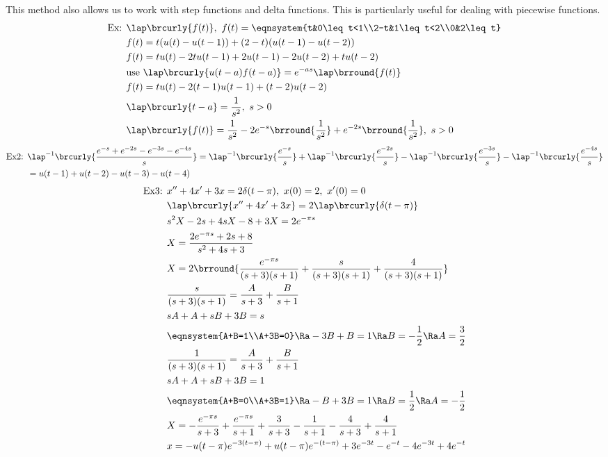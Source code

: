 This method also allows us to work with step functions and delta functions. This is particularly useful for dealing with piecewise functions.\\
\begin{align*}
    \text{Ex: }&\lap\brcurly{f(t)},\ f(t)=\eqnsystem{t&0\leq t<1\\2-t&1\leq t<2\\0&2\leq t}\\
    &f(t)=t(u(t)-u(t-1))+(2-t)(u(t-1)-u(t-2))\\
    &f(t)=tu(t)-2tu(t-1)+2u(t-1)-2u(t-2)+tu(t-2)\\
    &\text{use }\lap\brcurly{u(t-a)f(t-a)}=e^{-as}\lap\brround{f(t)}\\
    &f(t)=tu(t)-2(t-1)u(t-1)+(t-2)u(t-2)\\
    &\lap\brcurly{t-a}=\frac{1}{s^2},\ s>0\\
    &\lap\brcurly{f(t)}=\frac{1}{s^2}-2e^{-s}\brround{\frac{1}{s^2}}+e^{-2s}\brround{\frac{1}{s^2}},\ s>0
\end{align*}
\begin{align*}
    \text{Ex2: }&\lap^{-1}\brcurly{\frac{e^{-s}+e^{-2s}-e^{-3s}-e^{-4s}}{s}}=\lap^{-1}\brcurly{\frac{e^{-s}}{s}}+\lap^{-1}\brcurly{\frac{e^{-2s}}{s}}-\lap^{-1}\brcurly{\frac{e^{-3s}}{s}}-\lap^{-1}\brcurly{\frac{e^{-4s}}{s}}\\
    &=u(t-1)+u(t-2)-u(t-3)-u(t-4)
\end{align*}
\begin{align*}
    \text{Ex3: }&x''+4x'+3x=2\delta(t-\pi),\ x(0)=2,\ x'(0)=0\\
    &\lap\brcurly{x''+4x'+3x}=2\lap\brcurly{\delta(t-\pi)}\\
    &s^2X-2s+4sX-8+3X=2e^{-\pi s}\\
    &X=\frac{2e^{-\pi s}+2s+8}{s^2+4s+3}\\
    &X=2\brround{\frac{e^{-\pi s}}{(s+3)(s+1)}+\frac{s}{(s+3)(s+1)}+\frac{4}{(s+3)(s+1)}}\\
    &\frac{s}{(s+3)(s+1)}=\frac{A}{s+3}+\frac{B}{s+1}\\
    &sA+A+sB+3B=s\\
    &\eqnsystem{A+B=1\\A+3B=0}\Ra -3B+B=1\Ra B=-\frac{1}{2}\Ra A=\frac{3}{2}\\
    &\frac{1}{(s+3)(s+1)}=\frac{A}{s+3}+\frac{B}{s+1}\\
    &sA+A+sB+3B=1\\
    &\eqnsystem{A+B=0\\A+3B=1}\Ra -B+3B=1\Ra B=\frac{1}{2}\Ra A=-\frac{1}{2}\\
    &X=-\frac{e^{-\pi s}}{s+3}+\frac{e^{-\pi s}}{s+1}+\frac{3}{s+3}-\frac{1}{s+1}-\frac{4}{s+3}+\frac{4}{s+1}\\
    &x=-u(t-\pi)e^{-3(t-\pi)}+u(t-\pi)e^{-(t-\pi)}+3e^{-3t}-e^{-t}-4e^{-3t}+4e^{-t}
\end{align*}
